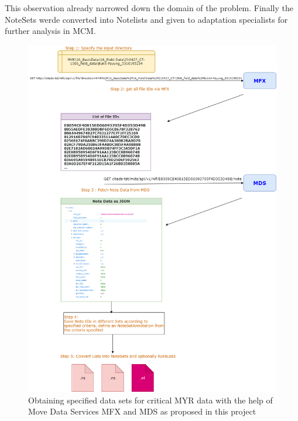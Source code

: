 This observation already narrowed down the domain of the problem.  Finally the NoteSets werde converted into Notelists and given to adaptation specialists for further analysis in MCM. 
\begin{figure}[!htb]
 \includegraphics[width=0.75\linewidth]{images/ns_generation_myr.png}
 \caption{Obtaining specified data sets for critical MYR data with the help of Move Data Services MFX and MDS as proposed in this project}\label{fig:ns_generation_ew}
\end{figure}
